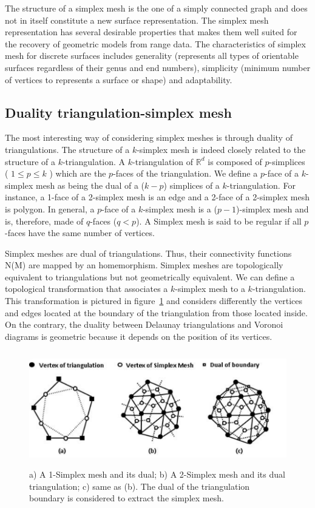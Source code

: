 \documentclass{InsightArticle}
\begin{document}
The structure of a simplex mesh is the one of a simply connected graph and does not in itself constitute a new surface representation. The simplex mesh representation has several desirable properties that makes them well suited for the recovery of geometric models from range data. The characteristics of simplex mesh for discrete surfaces includes generality (represents all types of orientable surfaces regardless of their genus and end numbers), simplicity (minimum number of vertices to represents a surface or shape) and adaptability.

\subsection{Duality triangulation-simplex mesh}
The most interesting way of considering simplex meshes is through duality of triangulations. The structure of a $k$-simplex mesh is indeed closely related to the structure of a $k$-triangulation. A $k$-triangulation of $\mathbb{R}^d$ is composed of $p$-simplices ( $1 \leq p \leq k$ ) which are the $p$-faces of the triangulation. We define a $p$-face of a $k$-simplex mesh as being the dual of a ($k-p$) simplices of a $k$-triangulation. For instance, a 1-face of a 2-simplex mesh is an edge and a 2-face of a 2-simplex mesh is polygon. In general, a $p$-face of a $k$-simplex mesh is a ($p-1$)-simplex mesh and is, therefore, made of $q$-faces ($q < p$). A Simplex mesh is said to be regular if all $p$-faces have the same number of vertices.

Simplex meshes are dual of triangulations. Thus, their connectivity functions N(M) are mapped by an homemorphism. Simplex meshes are topologically equivalent to triangulations but not geometrically equivalent. We can define a topological transformation that associates a $k$-simplex mesh to a $k$-triangulation. This transformation is pictured in figure~\ref{fig:simplexMeshes} and considers differently the vertices and edges located at the boundary of the triangulation from those located inside. On the contrary, the duality between Delaunay triangulations and Voronoi diagrams is geometric because it depends on the position of its vertices. 

\begin{figure}
	\centering
	\includegraphics[width=150mm, height=50mm]{SimplexMesh_Examples}
	\caption{a) A 1-Simplex mesh and its dual; b) A 2-Simplex mesh and its dual triangulation; c) same as (b). The dual of the triangulation boundary is considered to extract the simplex mesh.}
	\label{fig:simplexMeshes}
\end{figure}
\end{document}
